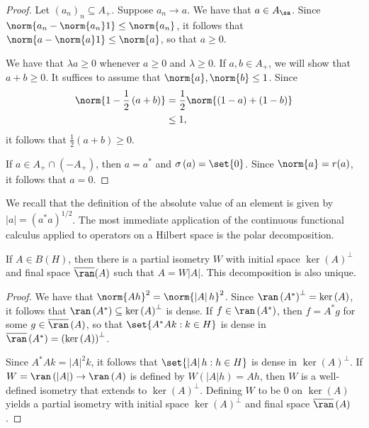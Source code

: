 \documentclass[10pt]{mypackage}
\begin{document}
\begin{proof}
  Let $\left( a_n \right)_{n}\subseteq A_{+}$. Suppose $a_n\to a$. We have that $a\in A_{\sa}$. Since $\norm{a_n-\norm{a_n}1}\leq \norm{a_n}$, it follows that $\norm{a-\norm{a}1}\leq \norm{a}$, so that $a\geq 0$.

  We have that $\lambda a\geq 0$ whenever $a\geq 0$ and $\lambda\geq 0$. If $a,b\in A_{+}$, we will show that $ a + b\geq 0 $. It suffices to assume that $\norm{a},\norm{b}\leq 1$. Since
  \begin{align*}
    \norm{1 - \frac{1}{2}\left( a+b \right)} &= \frac{1}{2}\norm{\left( 1-a \right) + \left( 1-b \right)}\\
                                             &\leq 1,
  \end{align*}
  it follows that $\frac{1}{2}\left( a+b \right)\geq 0$.

  If $a\in A_{+}\cap \left( -A_{+} \right)$, then $a=a^{\ast}$ and $\sigma\left( a \right) = \set{0}$. Since $\norm{a} = r(a)$, it follows that $a= 0$.
\end{proof}
We recall that the definition of the absolute value of an element is given by $\left\vert a \right\vert = \left( a^{\ast}a \right)^{1/2}$. The most immediate application of the continuous functional calculus applied to operators on a Hilbert space is the polar decomposition.
\begin{theorem}
  If $A\in B(H)$, then there is a partial isometry $W$ with initial space $\ker(A)^{\perp}$ and final space $ \overline{\ran}(A) $ such that $A = W\left\vert A \right\vert$. This decomposition is also unique.
\end{theorem}
\begin{proof}
  We have that $\norm{Ah}^2 = \norm{\left\vert A \right\vert h}^2$. Since $ \ran\left( A^{\ast} \right)^{\perp} = \ker\left( A \right) $, it follows that $\ran\left( A^{\ast} \right)\subseteq \ker\left( A \right)^{\perp}$ is dense. If $f\in \ran\left( A^{\ast} \right)$, then $f = A^{\ast}g$ for some $g\in \overline{\ran}\left( A \right)$, so that $\set{A^{\ast}A k : k\in H}$ is dense in $ \overline{\ran}\left( A^{\ast} \right) = \left( \ker\left( A \right) \right)^{\perp}$.

  Since $A^{\ast}Ak = \left\vert A \right\vert^2k$, it follows that $\set{\left\vert A \right\vert h : h\in H}$ is dense in $\ker\left( A \right)^{\perp}$. If $W = \ran\left( \left\vert A \right\vert \right)\to \ran\left( A \right)$ is defined by $W\left( \left\vert A \right\vert h \right) = Ah$, then $W$ is a well-defined isometry that extends to $\ker\left( A \right)^{\perp}$. Defining $W$ to be $0$ on $\ker\left( A \right)$ yields a partial isometry with initial space $ \ker\left( A \right)^{\perp} $ and final space $ \overline{\ran}\left( A \right) $.
\end{proof}
\end{document}
